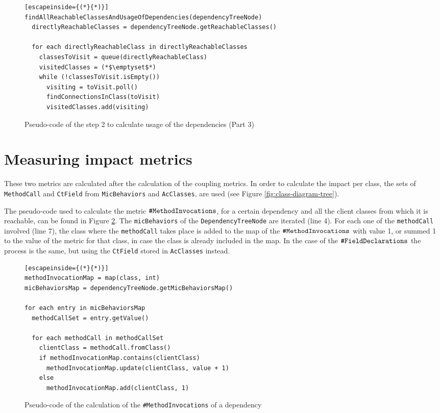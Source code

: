 \begin{figure}[ht!]
\begin{lstlisting}[escapeinside={(*}{*)}]
findAllReachableClassesAndUsageOfDependencies(dependencyTreeNode)
  directlyReachableClasses = dependencyTreeNode.getReachableClasses()

  for each directlyReachableClass in directlyReachableClasses
    classesToVisit = queue(directlyReachableClass)
    visitedClasses = (*$\emptyset$*)
    while (!classesToVisit.isEmpty())
      visiting = toVisit.poll()
      findConnectionsInClass(toVisit)
      visitedClasses.add(visiting)
\end{lstlisting}
\caption{Pseudo-code of the step 2 to calculate usage of the dependencies (Part 3)}
\label{fig:algorithm-usage-step2-3}
\end{figure}

\section{Measuring impact metrics}
These two metrics are calculated after the calculation of the coupling metrics. In order to calculate the impact per class, the sets of \texttt{MethodCall} and \texttt{CtField} from \texttt{MicBehaviors} and \texttt{AcClasses}, are used (see Figure \ref{fig:class-diagram-tree}).

The pseudo-code used to calculate the metric $\verb|#MethodInvocations|$, for a certain dependency and all the client classes from which it is reachable, can be found in Figure \ref{fig:algorithm-method-invocations}. The \texttt{micBehaviors} of the \texttt{DependencyTreeNode} are iterated (line 4). For each one of the \texttt{methodCall} involved (line 7), the class where the \texttt{methodCall} takes place is added to the map of the $\verb|#MethodInvocations|$ with value 1, or summed 1 to the value of the metric for that class, in case the class is already included in the map. In the case of the $\verb|#FieldDeclarations|$ the process is the same, but using the \texttt{CtField} stored in \texttt{AcClasses} instead.

\begin{figure}[ht!]
\begin{lstlisting}[escapeinside={(*}{*)}]
methodInvocationMap = map(class, int)
micBehaviorsMap = dependencyTreeNode.getMicBehaviorsMap()

for each entry in micBehaviorsMap
  methodCallSet = entry.getValue()

  for each methodCall in methodCallSet
    clientClass = methodCall.fromClass()
    if methodInvocationMap.contains(clientClass)
      methodInvocationMap.update(clientClass, value + 1)
    else
      methodInvocationMap.add(clientClass, 1)
\end{lstlisting}
\caption{Pseudo-code of the calculation of the \texttt{\#MethodInvocations} of a dependency}
\label{fig:algorithm-method-invocations}
\end{figure}

